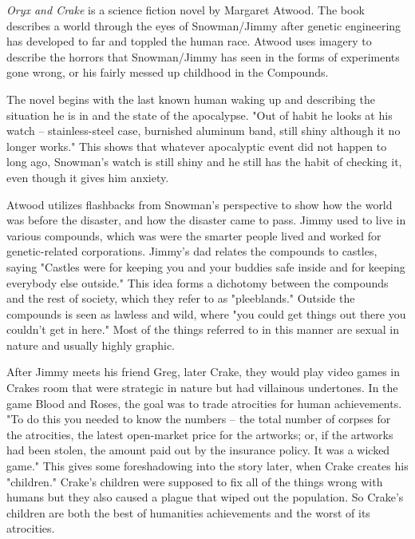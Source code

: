{\it Oryx and Crake} is a science fiction novel by Margaret Atwood.
The book describes a world through the eyes of Snowman/Jimmy after genetic engineering has developed to far and toppled the human race.
Atwood uses imagery to describe the horrors that Snowman/Jimmy has seen in the forms of experiments gone wrong, or his fairly messed up childhood in the Compounds.

The novel begins with the last known human waking up and describing the situation he is in and the state of the apocalypse.
"Out of habit he looks at his watch -- stainless-steel case, burnished aluminum band, still shiny although it no longer works." \autocite[3]{atwood1}
This shows that whatever apocalyptic event did not happen to long ago, Snowman's watch is still shiny and he still has the habit of checking it, even though it gives him anxiety.

Atwood utilizes flashbacks from Snowman's perspective to show how the world was before the disaster, and how the disaster came to pass.
Jimmy used to live in various compounds, which was were the smarter people lived and worked for genetic-related corporations.
Jimmy's dad relates the compounds to castles, saying "Castles were for keeping you and your buddies safe inside and for keeping everybody else outside." \autocite[28]{atwood1}
This idea forms a dichotomy between the compounds and the rest of society, which they refer to as "pleeblands."
Outside the compounds is seen as lawless and wild, where "you could get things out there you couldn't get in here." \autocite[64]{atwood1}
Most of the things referred to in this manner are sexual in nature and usually highly graphic.

After Jimmy meets his friend Greg, later Crake, they would play video games in Crakes room that were strategic in nature but had villainous undertones.
In the game Blood and Roses, the goal was to trade atrocities for human achievements.
"To do this you needed to know the numbers – the total number of corpses for the atrocities, the latest open-market price for the artworks; or, if the artworks had been stolen, the amount paid out by the insurance policy.
It was a wicked game." \autocite[79]{atwood1}
This gives some foreshadowing into the story later, when Crake creates his "children."
Crake's children were supposed to fix all of the things wrong with humans but they also caused a plague that wiped out the population.
So Crake's children are both the best of humanities achievements and the worst of its atrocities.